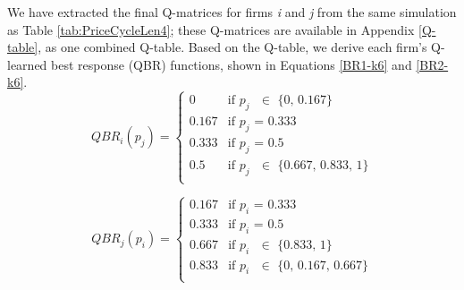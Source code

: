 \documentclass{article}
\begin{document}
\newline
We have extracted the final Q-matrices for firms \textit{i} and \textit{j} from the same simulation as Table \ref{tab:PriceCycleLen4}; these Q-matrices are available in Appendix \ref{Q-table}, as one combined Q-table. Based on the Q-table, we derive each firm’s Q-learned best response (QBR) functions, shown in Equations \ref{BR1-k6} and \ref{BR2-k6}.
\begin{equation}
    \label{BR1-k6}
    QBR_i(p_j)=\begin{cases}
        0 & \text{if $p_j$ $\in$ \{0, 0.167\}}\\
        0.167 & \text{if $p_j$ = 0.333}\\
        0.333 & \text{if $p_j$ = 0.5}\\
        0.5 & \text{if $p_j$ $\in$ \{0.667, 0.833, 1\}}\\
    \end{cases}
\end{equation}

\begin{equation}
    \label{BR2-k6}
    QBR_j(p_i)=\begin{cases}
        0.167 & \text{if $p_i$ = 0.333}\\
        0.333 & \text{if $p_i$ = 0.5}\\
        0.667 & \text{if $p_i$ $\in$ \{0.833, 1\}}\\
        0.833 & \text{if $p_i$ $\in$ \{0, 0.167, 0.667\}}\\
    \end{cases}
\end{equation}
\end{document}
